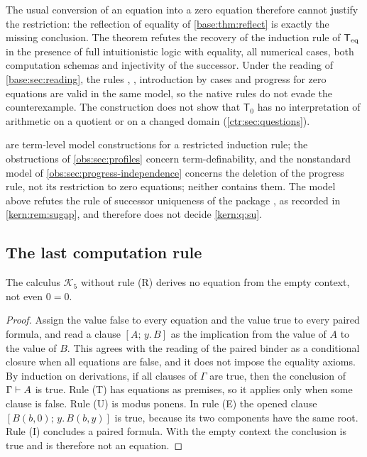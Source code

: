 The usual conversion of an equation into a zero equation therefore cannot justify the
restriction: the reflection of equality of \cref{base:thm:reflect} is exactly the missing
conclusion. The theorem refutes the recovery of the induction rule of $\mathsf{T}_{\mathrm{eq}}$ in the
presence of full intuitionistic logic with equality, all numerical cases, both computation
schemas and injectivity of the successor. Under the reading of \cref{base:sec:reading}, the
rules , , introduction by cases and progress for zero equations
are valid in the same model, so the native rules do not evade the counterexample. The
construction does not show that $\mathsf T_0$ has no interpretation of arithmetic on a
quotient or on a changed domain (\cref{ctr:sec:questions}).

\begin{remark}
 are term-level model constructions for a
restricted induction rule; the obstructions of \cref{obs:sec:profiles} concern
term-definability, and the nonstandard model of \cref{obs:sec:progress-independence}
concerns the deletion of the progress rule, not its restriction to zero equations; neither
contains them. The model above refutes the rule of
successor uniqueness of the package , as recorded in
\cref{kern:rem:sugap}, and therefore does not decide \cref{kern:q:su}.
\end{remark}

\subsection{The last computation rule}

\begin{proposition}\label{ctr:prop:norule}
The calculus $\mathcal K_5$ without rule (R) derives no equation from the empty context,
not even $0=0$.
\end{proposition}
\begin{proof}
Assign the value false to every equation and the value true to every paired formula, and
read a clause $[A;\,y.\,B]$ as the implication from the value of $A$ to the value of $B$.
This agrees with the reading of the paired binder as a conditional closure when all
equations are false, and it does not impose the equality axioms. By induction on
derivations, if all clauses of $\Gamma$ are true, then the conclusion of $\Gamma\vdash A$
is true. Rule (T) has equations as premises, so it applies only when some clause is false.
Rule (U) is modus ponens. In rule (E) the opened clause $[B(b,0);\,y.\,B(b,y)]$ is true,
because its two components have the same root. Rule (I) concludes a paired formula. With
the empty context the conclusion is true and is therefore not an equation.
\end{proof}


